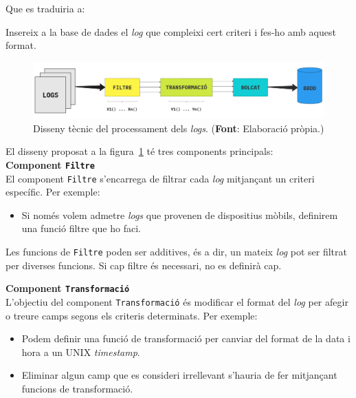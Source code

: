 \noindent
Que es traduiria a:
\begin{center}
    Insereix a la base de dades el \textit{\gls{log}} que compleixi cert criteri i fes-ho amb aquest format.
\end{center}

\begin{figure}[htbp]
    \centerline{\includegraphics[width=1\textwidth]{figures/log-processing}}
    \captionsetup{justification=centering}
    \caption[Disseny tècnic del processament dels \textit{logs}.]{Disseny tècnic del processament dels \textit{logs}. (\textbf{Font}: Elaboració pròpia.)}\label{fig:log-processing}
\end{figure}

\noindent
El disseny proposat a la figura~\ref{fig:log-processing} té tres components principals: \\

\noindent
\textbf{Component \texttt{Filtre}} \\

\noindent
El component \texttt{Filtre} s’encarrega de filtrar cada \textit{\gls{log}} mitjançant un criteri específic.
Per exemple:
\begin{itemize}
    \item Si només volem admetre \textit{\gls{log}s} que provenen de dispositius mòbils, definirem una funció filtre que ho faci.
\end{itemize}

\noindent
Les funcions de \texttt{Filtre} poden ser additives, és a dir, un mateix \textit{\gls{log}} pot ser filtrat per diverses funcions.
Si cap filtre és necessari, no es definirà cap. \\

\clearpage

\noindent
\textbf{Component \texttt{Transformació}} \\

\noindent
L’objectiu del component \texttt{Transformació} és modificar el format del \textit{\gls{log}} per afegir o treure camps segons els criteris determinats.
Per exemple:

\begin{itemize}
    \item Podem definir una funció de transformació per canviar del format de la data i hora a un UNIX \textit{\gls{timestamp}}.
    \item Eliminar algun camp que es consideri irrellevant s’hauria de fer mitjançant funcions de transformació.
\end{itemize}

